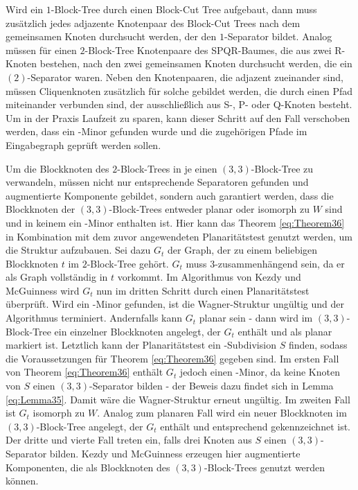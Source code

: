 Wird ein $1$-Block-Tree durch einen Block-Cut Tree aufgebaut, dann muss zusätzlich jedes adjazente Knotenpaar des Block-Cut Trees nach dem gemeinsamen Knoten durchsucht werden, der den $1$-Separator bildet.
Analog müssen für einen $2$-Block-Tree Knotenpaare des SPQR-Baumes, die aus zwei R-Knoten bestehen, nach den zwei gemeinsamen Knoten durchsucht werden, die ein $(2)$-Separator waren.
Neben den Knotenpaaren, die adjazent zueinander sind, müssen Cliquenknoten zusätzlich für solche gebildet werden, die durch einen Pfad miteinander verbunden sind, der ausschließlich aus S-, P- oder Q-Knoten besteht.
Um in der Praxis Laufzeit zu sparen, kann dieser Schritt auf den Fall verschoben werden, dass ein \kf-Minor gefunden wurde und die zugehörigen Pfade im Eingabegraph geprüft werden sollen.

Um die Blockknoten des $2$-Block-Trees in je einen $(3, 3)$-Block-Tree zu verwandeln, müssen nicht nur entsprechende Separatoren gefunden und augmentierte Komponente gebildet, sondern auch garantiert werden, dass die Blockknoten der $(3, 3)$-Block-Trees entweder planar oder isomorph zu $W$ sind und in keinem ein \kf-Minor enthalten ist.
Hier kann das Theorem \ref{eq:Theorem36} in Kombination mit dem zuvor angewendeten Planaritätstest genutzt werden, um die Struktur aufzubauen.
Sei dazu $G_t$ der Graph, der zu einem beliebigen Blockknoten $t$ im $2$-Block-Tree gehört.
$G_t$ muss $3$-zusammenhängend sein, da er als Graph vollständig in $t$ vorkommt.
Im Algorithmus von Kezdy und McGuinness wird $G_t$ nun im dritten Schritt durch einen Planaritätstest überprüft.
Wird ein \kf-Minor gefunden, ist die Wagner-Struktur ungültig und der Algorithmus terminiert.
Andernfalls kann $G_t$ planar sein - dann wird im $(3, 3)$-Block-Tree ein einzelner Blockknoten angelegt, der $G_t$ enthält und als planar markiert ist.
Letztlich kann der Planaritätstest ein \kdd-Subdivision $S$ finden, sodass die Voraussetzungen für Theorem \ref{eq:Theorem36} gegeben sind.
Im ersten Fall von Theorem \ref{eq:Theorem36} enthält $G_t$ jedoch einen \kf-Minor, da keine Knoten von $S$ einen $(3, 3)$-Separator bilden - der Beweis dazu findet sich in Lemma \ref{eq:Lemma35}.
Damit wäre die Wagner-Struktur erneut ungültig.
Im zweiten Fall ist $G_t$ isomorph zu $W$.
Analog zum planaren Fall wird ein neuer Blockknoten im $(3, 3)$-Block-Tree angelegt, der $G_t$ enthält und entsprechend gekennzeichnet ist.
Der dritte und vierte Fall treten ein, falls drei Knoten aus $S$ einen $(3, 3)$-Separator bilden.
Kezdy und McGuinness erzeugen hier augmentierte Komponenten, die als Blockknoten des $(3, 3)$-Block-Trees genutzt werden können.
